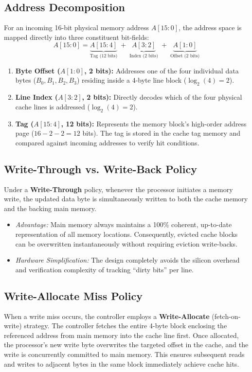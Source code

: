 \documentclass[conference]{IEEEtran}
\begin{document}
\subsection{Address Decomposition}
For an incoming 16-bit physical memory address $A[15:0]$, the address space is mapped directly into three constituent bit-fields:
\begin{equation}
A[15:0] = \underbrace{A[15:4]}_{\text{Tag (12 bits)}} \;+\; \underbrace{A[3:2]}_{\text{Index (2 bits)}} \;+\; \underbrace{A[1:0]}_{\text{Offset (2 bits)}}
\end{equation}

\begin{enumerate}
    \item \textbf{Byte Offset ($A[1:0]$, 2 bits):} Addresses one of the four individual data bytes ($B_0, B_1, B_2, B_3$) residing inside a 4-byte line block ($\log_2(4) = 2$).
    \item \textbf{Line Index ($A[3:2]$, 2 bits):} Directly decodes which of the four physical cache lines is addressed ($\log_2(4) = 2$).
    \item \textbf{Tag ($A[15:4]$, 12 bits):} Represents the memory block's high-order address page ($16 - 2 - 2 = 12$ bits). The tag is stored in the cache tag memory and compared against incoming addresses to verify hit conditions.
\end{enumerate}

\subsection{Write-Through vs. Write-Back Policy}
Under a \textbf{Write-Through} policy, whenever the processor initiates a memory write, the updated data byte is simultaneously written to both the cache memory and the backing main memory. 
\begin{itemize}
    \item \textit{Advantage:} Main memory always maintains a 100\% coherent, up-to-date representation of all memory locations. Consequently, evicted cache blocks can be overwritten instantaneously without requiring eviction write-backs.
    \item \textit{Hardware Simplification:} The design completely avoids the silicon overhead and verification complexity of tracking ``dirty bits'' per line.
\end{itemize}

\subsection{Write-Allocate Miss Policy}
When a write miss occurs, the controller employs a \textbf{Write-Allocate} (fetch-on-write) strategy. The controller fetches the entire 4-byte block enclosing the referenced address from main memory into the cache line first. Once allocated, the processor's new write byte overwrites the targeted offset in the cache, and the write is concurrently committed to main memory. This ensures subsequent reads and writes to adjacent bytes in the same block immediately achieve cache hits.
\end{document}
